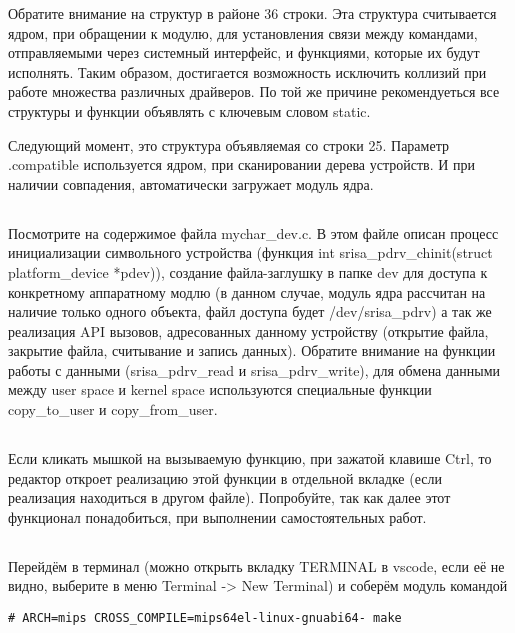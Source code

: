 Обратите внимание на структур в районе 36 строки. Эта структура считывается ядром, при обращении к модулю, для установления связи между командами, отправляемыми через системный интерфейс, и функциями, которые их будут исполнять. Таким образом, достигается возможность исключить коллизий при работе множества различных драйверов. По той же причине рекомендуеться  все структуры и функции объявлять с ключевым словом static.

Следующий момент, это структура объявляемая со строки 25. Параметр .compatible используется ядром, при сканировании дерева устройств. И при наличии совпадения, автоматически загружает модуль ядра.  

\subsection{}Посмотрите на содержимое файла mychar\_dev.c. В этом файле описан процесс инициализации символьного устройства (функция int srisa\_pdrv\_chinit(struct platform\_device *pdev)), создание файла-заглушку в папке dev для доступа к конкретному аппаратному модлю (в данном случае, модуль ядра рассчитан на наличие только одного объекта, файл доступа будет /dev/srisa\_pdrv) а так же реализация API вызовов, адресованных данному устройству (открытие файла, закрытие файла, считывание и запись данных).
Обратите внимание на функции работы с данными (srisa\_pdrv\_read и srisa\_pdrv\_write), для обмена данными между user space и kernel space используются специальные функции copy\_to\_user и copy\_from\_user.

\subsection{}Если кликать мышкой на вызываемую функцию, при зажатой клавише Ctrl, то редактор откроет реализацию этой функции в отдельной вкладке (если реализация находиться в другом файле). Попробуйте, так как далее этот функционал понадобиться, при выполнении самостоятельных работ.

\subsection{}Перейдём в терминал (можно открыть вкладку TERMINAL в vscode, если её не видно, выберите в меню Terminal -> New Terminal) и соберём модуль командой
\begin{lstlisting}[style=bash]
# ARCH=mips CROSS_COMPILE=mips64el-linux-gnuabi64- make
\end{lstlisting}

